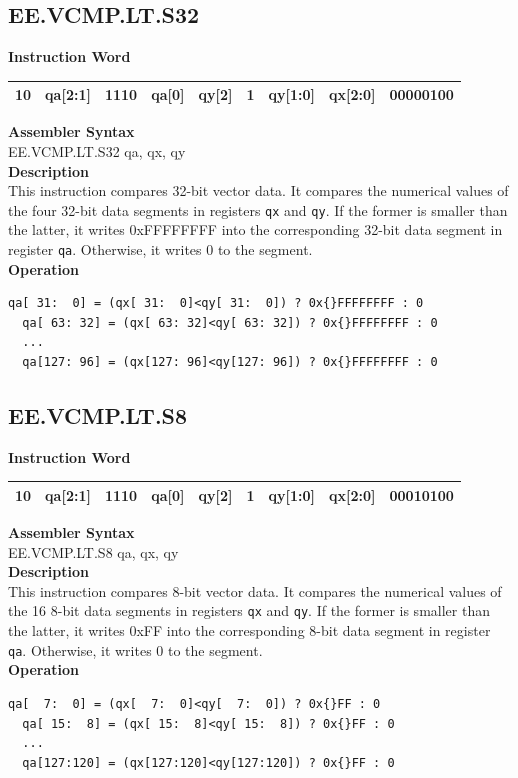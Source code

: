 \clearpage
\subsection{EE.VCMP.LT.S32}\label{instruction:EEVCMPLTS32}
\setlength\tabcolsep{6pt}
\textbf{Instruction Word} \\
\begin{tabular}{|c|c|c|c|c|c|c|c|c|}
	\hline
	10 & qa[2:1] & 1110 & qa[0] & qy[2] & 1 & qy[1:0] & qx[2:0] & 00000100 \\
	\hline
\end{tabular}

\textbf{Assembler Syntax} \\
EE.VCMP.LT.S32 qa, qx, qy \\
\textbf{Description} \\
This instruction compares 32-bit vector data. It compares the numerical values of the four 32-bit data segments in registers \lstinline{qx} and \lstinline{qy}. If the former is smaller than the latter, it writes 0x{}FFFFFFFF into the corresponding 32-bit data segment in register \lstinline{qa}. Otherwise, it writes 0 to the segment.\\
\textbf{Operation}
\begin{lstlisting}[escapeinside=`?]
  qa[ 31:  0] = (qx[ 31:  0]<qy[ 31:  0]) ? 0x{}FFFFFFFF : 0
  qa[ 63: 32] = (qx[ 63: 32]<qy[ 63: 32]) ? 0x{}FFFFFFFF : 0
  ...
  qa[127: 96] = (qx[127: 96]<qy[127: 96]) ? 0x{}FFFFFFFF : 0
\end{lstlisting}

\clearpage
\subsection{EE.VCMP.LT.S8}\label{instruction:EEVCMPLTS8}
\setlength\tabcolsep{6pt}
\textbf{Instruction Word} \\
\begin{tabular}{|c|c|c|c|c|c|c|c|c|}
	\hline
	10 & qa[2:1] & 1110 & qa[0] & qy[2] & 1 & qy[1:0] & qx[2:0] & 00010100 \\
	\hline
\end{tabular}

\textbf{Assembler Syntax} \\
EE.VCMP.LT.S8 qa, qx, qy \\
\textbf{Description} \\
This instruction compares 8-bit vector data. It compares the numerical values of the 16 8-bit data segments in registers \lstinline{qx} and \lstinline{qy}. If the former is smaller than the latter, it writes 0x{}FF into the corresponding 8-bit data segment in register \lstinline{qa}. Otherwise, it writes 0 to the segment.\\
\textbf{Operation}
\begin{lstlisting}[escapeinside=`?]
  qa[  7:  0] = (qx[  7:  0]<qy[  7:  0]) ? 0x{}FF : 0
  qa[ 15:  8] = (qx[ 15:  8]<qy[ 15:  8]) ? 0x{}FF : 0
  ...
  qa[127:120] = (qx[127:120]<qy[127:120]) ? 0x{}FF : 0
\end{lstlisting}


